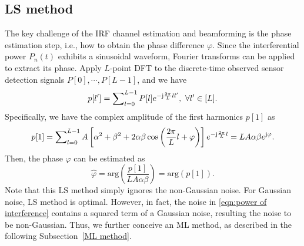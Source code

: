 \documentclass[12pt,draftclsnofoot,journal,onecolumn]{IEEEtran}
\theoremstyle{nonumberplain}
\def \arg {\text{arg}}
\begin{document}
\subsection{LS method}  \label{LS method}
    The key challenge of the IRF channel estimation and beamforming is the phase estimation step, i.e., how to obtain the phase difference $\varphi$. Since the interferential power $P_n(t)$ exhibits a sinusoidal waveform, Fourier transforms can be applied to extract its phase. Apply $L$-point \ac{DFT} to the discrete-time  observed sensor detection signals $P[0],\cdots ,P[L-1]$, and we have
    \begin{equation}
        \label{DFT}
        p[l']=\sum\nolimits_{l=0}^{L-1}P[l]e^{-{\rm j}\frac{2\pi}{L}ll'},~\forall l'\in [L].
    \end{equation}
    Specifically, we have the complex amplitude of the first harmonics $p[1]$ as 
    \begin{equation}
        \label{DFT l=1}
        p[1]=\sum\nolimits_{l=0}^{L-1}A\left[\alpha^{2}+\beta^{2}+2\alpha\beta\cos\left(\frac{2\pi}{L}l+\varphi\right)\right]e^{-{\rm j}\frac{2\pi}{L}l}=LA\alpha\beta  e^{{\rm j}\varphi}.
    \end{equation}
    Then, the phase $\varphi$ can be estimated as
    \begin{equation}
        \label{LS estimate result}
        \hat{\varphi}=\arg\left(\frac{p[1]}{LA\alpha\beta}\right) = \arg\left(p[1]\right).
    \end{equation}
    Note that this LS method simply ignores the non-Gaussian noise. For Gaussian noise, LS method is optimal. However, in fact, the noise in \eqref{eqn:power of interference} contains a squared term of a Gaussian noise, resulting the noise to be non-Gaussian. Thus, we further conceive an ML method, as described in the following Subsection~\ref{ML method}. 
\end{document}
